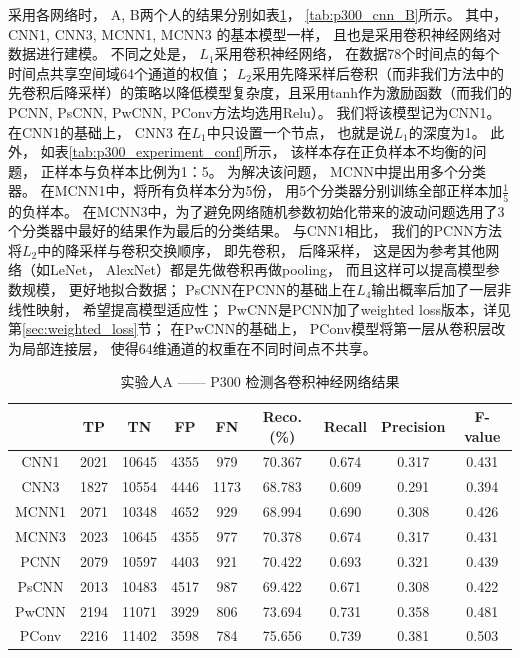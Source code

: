 采用各网络时， A, B两个人的结果分别如表\ref{tab:p300_cnn_A}， \ref{tab:p300_cnn_B}所示。 其中， CNN1, CNN3, MCNN1, MCNN3 \cite{cecotti2011convolutional}的基本模型一样， 且也是采用卷积神经网络对数据进行建模。 不同之处是， $L_1$采用卷积神经网络， 在数据78个时间点的每个时间点共享空间域64个通道的权值； $L_2$采用先降采样后卷积（而非我们方法中的先卷积后降采样）的策略以降低模型复杂度，且采用tanh作为激励函数（而我们的PCNN, PsCNN, PwCNN, PConv方法均选用Relu）。 我们将该模型记为CNN1。
在CNN1的基础上， CNN3 在$L_1$中只设置一个节点， 也就是说$L_1$的深度为1。 此外， 如表\ref{tab:p300_experiment_conf}所示， 该样本存在正负样本不均衡的问题， 正样本与负样本比例为1：5。 为解决该问题， MCNN中提出用多个分类器。 在MCNN1中，将所有负样本分为5份， 用5个分类器分别训练全部正样本加$\frac{1}{5}$的负样本。 在MCNN3中，为了避免网络随机参数初始化带来的波动问题选用了3个分类器中最好的结果作为最后的分类结果。 与CNN1相比， 我们的PCNN方法将$L_2$中的降采样与卷积交换顺序， 即先卷积， 后降采样， 这是因为参考其他网络（如LeNet， AlexNet）都是先做卷积再做pooling， 而且这样可以提高模型参数规模， 更好地拟合数据； PsCNN在PCNN的基础上在$L_4$输出概率后加了一层非线性映射， 希望提高模型适应性； PwCNN是PCNN加了weighted loss版本，详见第\ref{sec:weighted_loss}节； 在PwCNN的基础上， PConv模型将第一层从卷积层改为局部连接层， 使得64维通道的权重在不同时间点不共享。 



\begin{table}[ht]
\centering
  \caption{实验人A —— P300 检测各卷积神经网络结果}
  \begin{tabular}{|c||c|c|c|c|c|c|c|c|}
  \hline
   & TP & TN & FP & FN & Reco.(\%) & Recall & Precision & F-value \\
  \hline\hline
	CNN1 & 2021 & 10645 & 4355 & 979 & 70.367  & 0.674  & 0.317  & 0.431 \\
	\hline
	CNN3 & 1827 & 10554 & 4446 & 1173 & 68.783  & 0.609  & 0.291  & 0.394 \\
	\hline
	MCNN1 & 2071 & 10348 & 4652 & 929 & 68.994  & 0.690  & 0.308  & 0.426 \\
	\hline
	MCNN3 & 2023 & 10645 & 4355 & 977 & 70.378  & 0.674  & 0.317  & 0.431 \\
	\hline
	PCNN & 2079 & 10597 & 4403 & 921 & 70.422  & 0.693  & 0.321  & 0.439 \\
	\hline
	PsCNN & 2013 & 10483 & 4517 & 987 & 69.422  & 0.671  & 0.308  & 0.422 \\
	\hline
	PwCNN & 2194 & 11071 & 3929 & 806 & 73.694  & 0.731  & 0.358  & 0.481 \\
	\hline
	PConv & 2216 & 11402 & 3598 & 784 & 75.656  & 0.739  & 0.381  & 0.503 \\
  \hline
  \end{tabular}
  \centering \label{tab:p300_cnn_A}
\end{table}


